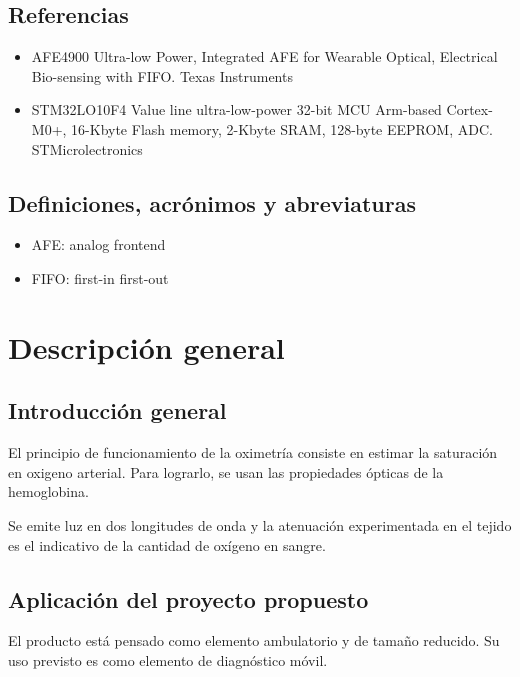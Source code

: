 \documentclass[
    11pt,
    spanish,
	a4paper
]{article}
\begin{document}
\subsection{Referencias}
\label{subsec:referencias}

\begin{itemize}
    \item AFE4900 Ultra-low Power, Integrated AFE for Wearable Optical, Electrical Bio-sensing with FIFO. Texas Instruments
    \item STM32LO10F4 Value line ultra-low-power 32-bit MCU Arm-based Cortex-M0+, 16-Kbyte Flash memory, 2-Kbyte SRAM, 128-byte EEPROM, ADC. STMicrolectronics
\end{itemize}

\subsection{Definiciones, acrónimos y abreviaturas}
\label{subsec:definiciones}

\begin{itemize}
    \item AFE: analog frontend
    \item FIFO: first-in first-out
\end{itemize}

\section{Descripción general}
\label{sec:descripcion}

\subsection{Introducción general}
\label{subsec:teorica}

El principio de funcionamiento de la oximetría consiste en estimar la saturación en oxigeno arterial.
Para lograrlo, se usan las propiedades ópticas de la hemoglobina.

Se emite luz en dos longitudes de onda y la atenuación experimentada en el tejido es el indicativo de la cantidad de oxígeno en sangre.

\subsection{Aplicación del proyecto propuesto}
\label{subsec:aplicacion}

El producto está pensado como elemento ambulatorio y de tamaño reducido.
Su uso previsto es como elemento de diagnóstico móvil.
\end{document}
